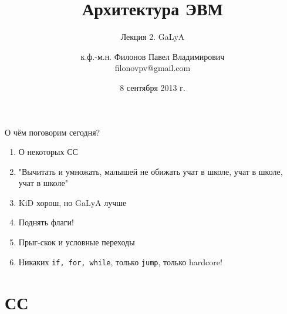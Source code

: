 \documentclass{beamer}
\title{Архитектура ЭВМ}
\subtitle{Лекция 2. GaLyA}
\author{к.ф.-м.н. Филонов Павел Владимирович \\ filonovpv@gmail.com}
\date{8 сентября 2013 г.}
\institute[МГТУ ГА] 
{
    Московский Государственный Технический Университет \\
    Гражданской Авиации
}
\begin{document}
    \frame{\titlepage}
    \begin{frame}{О чём поговорим сегодня?}
        \begin{enumerate}
            \pause
            \item О некоторых СС 
            \pause
            \item "Вычитать и умножать, малышей не обижать учат в школе, учат в школе, учат в школе"
            \pause
            \item KiD хорош, но GaLyA лучше
            \pause
            \item Поднять флаги!
            \pause
            \item Прыг-скок и условные переходы
            \pause
            \item Никаких {\tt if, for, while}, только {\tt jump}, только hardcore!
        \end{enumerate}
    \end{frame}

    \section{СС}
\end{document}

